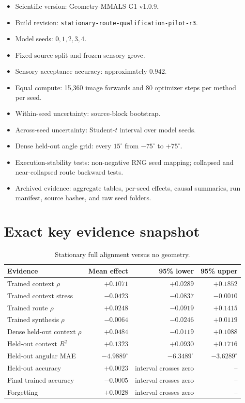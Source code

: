 \documentclass[11pt,a4paper]{article}
\begin{document}
\begin{itemize}
\item Scientific version: Geometry-MMALS G1 v1.0.9.
\item Build revision: \texttt{stationary-route-qualification-pilot-r3}.
\item Model seeds: $0,1,2,3,4$.
\item Fixed source split and frozen sensory grove.
\item Sensory acceptance accuracy: approximately $0.942$.
\item Equal compute: 15,360 image forwards and 80 optimizer steps per method per seed.
\item Within-seed uncertainty: source-block bootstrap.
\item Across-seed uncertainty: Student-$t$ interval over model seeds.
\item Dense held-out angle grid: every $15^{\circ}$ from $-75^{\circ}$ to $+75^{\circ}$.
\item Execution-stability tests: non-negative RNG seed mapping; collapsed and near-collapsed route backward tests.
\item Archived evidence: aggregate tables, per-seed effects, causal summaries, run manifest, source hashes, and raw seed folders.
\end{itemize}

\section{Exact key evidence snapshot}

\begin{table}[H]
\centering
\caption{Stationary full alignment versus no geometry.}
\begin{tabular}{lrrr}
\toprule
Evidence & Mean effect & 95\% lower & 95\% upper \\
\midrule
Trained context $\rho$ & $+0.1071$ & $+0.0289$ & $+0.1852$ \\
Trained context stress & $-0.0423$ & $-0.0837$ & $-0.0010$ \\
Trained route $\rho$ & $+0.0248$ & $-0.0919$ & $+0.1415$ \\
Trained synthesis $\rho$ & $-0.0064$ & $-0.0246$ & $+0.0119$ \\
Dense held-out context $\rho$ & $+0.0484$ & $-0.0119$ & $+0.1088$ \\
Held-out context $R^2$ & $+0.1323$ & $+0.0930$ & $+0.1716$ \\
Held-out angular MAE & $-4.9889^{\circ}$ & $-6.3489^{\circ}$ & $-3.6289^{\circ}$ \\
Held-out accuracy & $+0.0023$ & interval crosses zero & -- \\
Final trained accuracy & $-0.0005$ & interval crosses zero & -- \\
Forgetting & $+0.0028$ & interval crosses zero & -- \\
\bottomrule
\end{tabular}
\end{table}

\printbibliography
\end{document}
